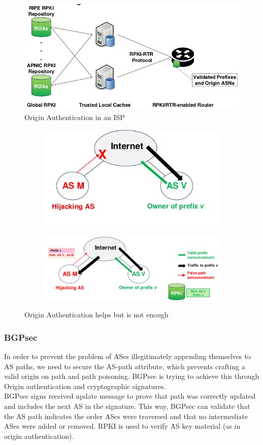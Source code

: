 \documentclass[11pt,oneside,a4paper]{article}
\begin{document}
\begin{figure}
	\centering
	\includegraphics[width=0.5\linewidth]{figures/origin_authentication}
	\caption{Origin Authentication in an ISP}
	\label{fig:originauthentication}
\end{figure}

\begin{figure}[b!]
	\centering
	\begin{subfigure}[t]{.5\textwidth}
		\centering
		\includegraphics[width=0.7\linewidth]{figures/bgp_oa_as_1}
		\label{fig:bgp_oa_as_1}
	\end{subfigure}%
	\begin{subfigure}[t]{.5\textwidth}
		\centering
		\includegraphics[width=1.1\linewidth]{figures/bgp_oa_as_2}
		\label{fig:bgp_oa_as_2}
	\end{subfigure}
	\caption{Origin Authentication helps but is not enough}
\end{figure}

\subsubsection{BGPsec}

In order to prevent the problem of ASes illegitimately appending themselves to AS paths, we need to secure the AS-path attribute, which prevents crafting a valid origin on path and path poisoning. BGPsec is trying to achieve this through Origin authentication and cryptographic signatures.\\
BGPsec signs received update message to prove that path was correctly updated and includes the next AS in the signature. This way, BGPsec can validate that the AS path indicates the order ASes were traversed and that no intermediate ASes were added or removed. RPKI is used to verify AS key material (as in origin authentication).\\
\end{document}
